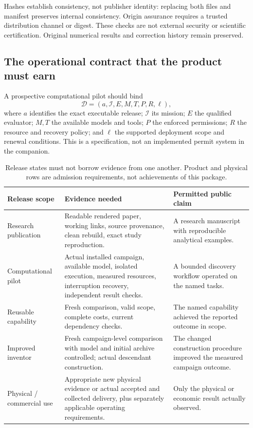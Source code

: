 \documentclass[11pt,letterpaper]{article}
\newcommand{\I}{\mathcal{I}}
\theoremstyle{remark}\newtheorem{remark}{Remark}[section]
\begin{document}
Hashes establish consistency, not publisher identity: replacing both files and manifest preserves internal consistency. Origin assurance requires a trusted distribution channel or digest. These checks are not external security or scientific certification. Original numerical results and correction history remain preserved.

\subsection{The operational contract that the product must earn}
A prospective computational pilot should bind
\begin{equation}
\mathcal D=(a,\I,E,M,T,P,R,\ell),
\end{equation}
where $a$ identifies the exact executable release; $\I$ its mission; $E$ the qualified evaluator; $M,T$ the available models and tools; $P$ the enforced permissions; $R$ the resource and recovery policy; and $\ell$ the supported deployment scope and renewal conditions. This is a specification, not an implemented permit system in the companion.

\begin{table}[htbp]
\small
\caption{Release states must not borrow evidence from one another. Product and physical rows are admission requirements, not achievements of this package.}
\begin{tabularx}{\linewidth}{P{2.4cm}YY}
\toprule
\textbf{Release scope}&\textbf{Evidence needed}&\textbf{Permitted public claim}\\\midrule
Research publication&Readable rendered paper, working links, source provenance, clean rebuild, exact study reproduction.&A research manuscript with reproducible analytical examples.\\
Computational pilot&Actual installed campaign, available model, isolated execution, measured resources, interruption recovery, independent result checks.&A bounded discovery workflow operated on the named tasks.\\
Reusable capability&Fresh comparison, valid scope, complete costs, current dependency checks.&The named capability achieved the reported outcome in scope.\\
Improved inventor&Fresh campaign-level comparison with model and initial archive controlled; actual descendant construction.&The changed construction procedure improved the measured campaign outcome.\\
Physical / commercial use&Appropriate new physical evidence or actual accepted and collected delivery, plus separately applicable operating requirements.&Only the physical or economic result actually observed.\\\bottomrule
\end{tabularx}
\end{table}
\end{document}
